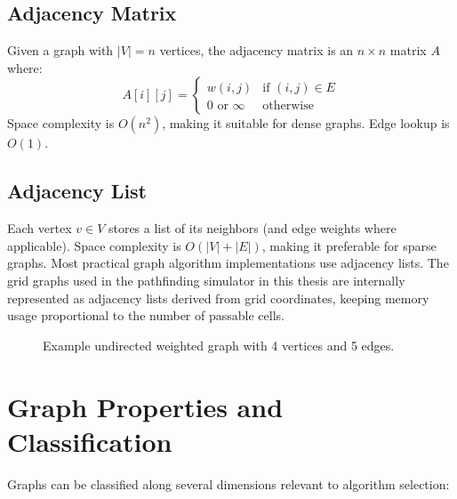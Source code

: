 \documentclass[12pt, a4paper, oneside]{report}
\theoremstyle{definition}
\begin{document}
\subsection{Adjacency Matrix}

Given a graph with $|V| = n$ vertices, the adjacency matrix is an $n \times n$ matrix $A$ where:
\[
A[i][j] = \begin{cases} w(i,j) & \text{if } (i,j) \in E \\ 0 \text{ or } \infty & \text{otherwise} \end{cases}
\]
Space complexity is $O(n^2)$, making it suitable for dense graphs. Edge lookup is $O(1)$.

\subsection{Adjacency List}

Each vertex $v \in V$ stores a list of its neighbors (and edge weights where applicable). Space complexity is $O(|V| + |E|)$, making it preferable for sparse graphs. Most practical graph algorithm implementations use adjacency lists. The grid graphs used in the pathfinding simulator in this thesis are internally represented as adjacency lists derived from grid coordinates, keeping memory usage proportional to the number of passable cells.

\begin{figure}[H]
\centering
{}
\caption{Example undirected weighted graph with 4 vertices and 5 edges.}
\label{fig:sample_graph}
\end{figure}

\section{Graph Properties and Classification}

Graphs can be classified along several dimensions relevant to algorithm selection:
\end{document}
